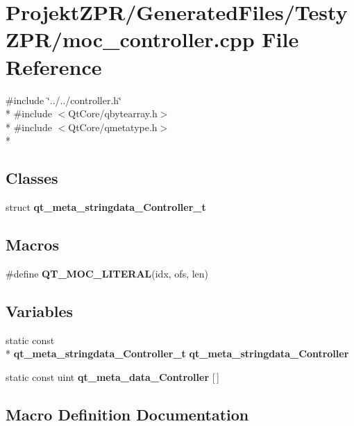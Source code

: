 \section{Projekt\-Z\-P\-R/\-Generated\-Files/\-Testy\-Z\-P\-R/moc\-\_\-controller.cpp File Reference}
\label{_testy_z_p_r_2moc__controller_8cpp}
{\ttfamily \#include \char`\"{}../../controller.\-h\char`\"{}}\\*
{\ttfamily \#include $<$Qt\-Core/qbytearray.\-h$>$}\\*
{\ttfamily \#include $<$Qt\-Core/qmetatype.\-h$>$}\\*
\subsection*{Classes}
\begin{DoxyCompactItemize}
\item 
struct {\bf qt\-\_\-meta\-\_\-stringdata\-\_\-\-Controller\-\_\-t}
\end{DoxyCompactItemize}
\subsection*{Macros}
\begin{DoxyCompactItemize}
\item 
\#define {\bf Q\-T\-\_\-\-M\-O\-C\-\_\-\-L\-I\-T\-E\-R\-A\-L}(idx, ofs, len)
\end{DoxyCompactItemize}
\subsection*{Variables}
\begin{DoxyCompactItemize}
\item 
static const \\*
{\bf qt\-\_\-meta\-\_\-stringdata\-\_\-\-Controller\-\_\-t} {\bf qt\-\_\-meta\-\_\-stringdata\-\_\-\-Controller}
\item 
static const uint {\bf qt\-\_\-meta\-\_\-data\-\_\-\-Controller} [$\,$]
\end{DoxyCompactItemize}


\subsection{Macro Definition Documentation}
